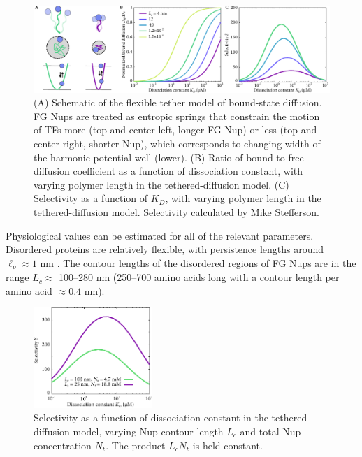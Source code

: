 \begin{figure}
\centering
\includegraphics[width=\textwidth]{figs/ch02/fig3.pdf}
\caption[Selectivity from tethered diffusion.]{(A) Schematic of the flexible tether model of bound-state
  diffusion. FG Nups are treated as entropic springs that constrain
  the motion of TFs more (top and center left, longer FG Nup) or less
  (top and center right, shorter Nup), which corresponds to changing
  width of the harmonic potential well (lower).  (B) Ratio of bound to
  free diffusion coefficient as a function of dissociation constant,
  with varying polymer length in the tethered-diffusion model.  (C)
  Selectivity as a function of $K_D$, with varying polymer length in
  the tethered-diffusion model.  Selectivity calculated by Mike Stefferson.}
\label{fig:tethers}
\end{figure}

Physiological values can be estimated for all of the relevant parameters.  Disordered proteins are relatively flexible, with persistence lengths around $\ell_p \approx 1$ nm \cite{receveur-brechot12}.  The contour lengths of the disordered regions of FG Nups are in the range $L_c\approx$ 100--280 nm (250--700 amino acids long \cite{patel07} with a contour length per amino acid $\approx 0.4$ nm).

\begin{figure}
\centering
\includegraphics[width=0.4\textwidth]{figs/ch02/chain-comparison.pdf}
\caption[Nup contour length and concentration comparison.]{Selectivity as a function of dissociation
  constant in the tethered diffusion model, varying Nup contour length $L_c$ and total Nup concentration $N_t$.  The product $L_cN_t$ is held constant.\\}
\label{fig:chainComparison}
\end{figure}

